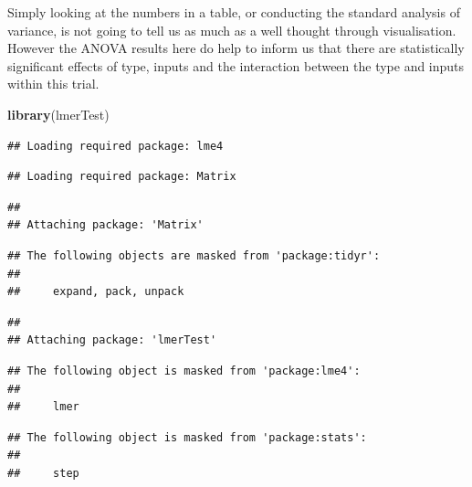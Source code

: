 \documentclass[
]{book}
\newenvironment{Shaded}{\begin{snugshade}}{\end{snugshade}}
\newcommand{\DataTypeTok}[1]{\textcolor[rgb]{0.13,0.29,0.53}{#1}}
\newcommand{\DecValTok}[1]{\textcolor[rgb]{0.00,0.00,0.81}{#1}}
\newcommand{\KeywordTok}[1]{\textcolor[rgb]{0.13,0.29,0.53}{\textbf{#1}}}
\newcommand{\NormalTok}[1]{#1}
\newcommand{\OperatorTok}[1]{\textcolor[rgb]{0.81,0.36,0.00}{\textbf{#1}}}
\newcommand{\StringTok}[1]{\textcolor[rgb]{0.31,0.60,0.02}{#1}}
\begin{document}
Simply looking at the numbers in a table, or conducting the standard analysis of variance, is not going to tell us as much as a well thought through visualisation. However the ANOVA results here do help to inform us that there are statistically significant effects of type, inputs and the interaction between the type and inputs within this trial.

\begin{Shaded}
\begin{Highlighting}[]
\KeywordTok{library}\NormalTok{(lmerTest)}
\end{Highlighting}
\end{Shaded}

\begin{verbatim}
## Loading required package: lme4
\end{verbatim}

\begin{verbatim}
## Loading required package: Matrix
\end{verbatim}

\begin{verbatim}
## 
## Attaching package: 'Matrix'
\end{verbatim}

\begin{verbatim}
## The following objects are masked from 'package:tidyr':
## 
##     expand, pack, unpack
\end{verbatim}

\begin{verbatim}
## 
## Attaching package: 'lmerTest'
\end{verbatim}

\begin{verbatim}
## The following object is masked from 'package:lme4':
## 
##     lmer
\end{verbatim}

\begin{verbatim}
## The following object is masked from 'package:stats':
## 
##     step
\end{verbatim}

\begin{Shaded}
\end{Shaded}
\end{document}
